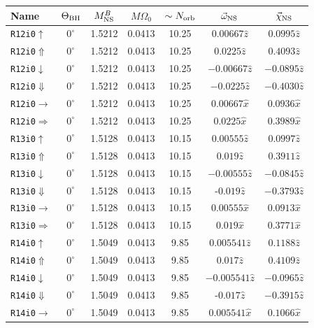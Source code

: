 \begin{longtable}{l|c|c|c|c|c|c}
\centering
\label{Tab:36Sets}
Name & $\Theta_{\rm BH}$ & $M^B_{\rm NS}$ & $M\Omega_{0}$ & $\sim N_{\rm orb}$ & $\vec{\omega}_{\rm NS}$ & $\vec{\chi}_{\rm NS}$  
\\\hline
{\tt R12i0$\uparrow$}&$0^\circ$ & 1.5212 & 0.0413 & 10.25 & $0.00667\hat{z}$ & $0.0995\hat{z}$ \\
{\tt R12i0$\Uparrow$}&$0^\circ$ & 1.5212 & 0.0413 & 10.25 & $0.0225\hat{z}$ & $0.4093\hat{z}$ \\
{\tt R12i0$\downarrow$}&$0^\circ$ & 1.5212 & 0.0413 & 10.25 & $-0.00667\hat{z}$& $-0.0895\hat{z}$\\
{\tt R12i0$\Downarrow$}&$0^\circ$ & 1.5212 & 0.0413 & 10.25 & $-0.0225\hat{z}$ & $-0.4030\hat{z}$ \\
{\tt R12i0$\rightarrow$}&$0^\circ$ & 1.5212 & 0.0413 & 10.25 & $0.00667\hat{x}$ & $0.0936\hat{x}$\\
{\tt R12i0$\Rightarrow$}&$0^\circ$ & 1.5212 & 0.0413 & 10.25 & $0.0225\hat{x}$ & $0.3989\hat{x}$ \\
\hline
{\tt R13i0$\uparrow$}&$0^\circ$ & 1.5128 & 0.0413  & 10.15 & $0.00555\hat{z}$ & $0.0997\hat{z}$ \\
{\tt R13i0$\Uparrow$}&$0^\circ$ & 1.5128 & 0.0413 & 10.15 & $0.019\hat{z}$ & $0.3911\hat{z}$ \\
{\tt R13i0$\downarrow$}&$0^\circ$ & 1.5128 & 0.0413 & 10.15 & $-0.00555\hat{z}$& $-0.0845\hat{z}$\\
{\tt R13i0$\Downarrow$}&$0^\circ$ & 1.5128 & 0.0413 & 10.15 & -$0.019\hat{z}$ & $-0.3793\hat{z}$ \\
{\tt R13i0$\rightarrow$}&$0^\circ$ & 1.5128 & 0.0413 & 10.15 & $0.00555\hat{x}$ & $0.0913\hat{x}$\\
{\tt R13i0$\Rightarrow$}&$0^\circ$ & 1.5128 & 0.0413 & 10.15 & $0.019\hat{x}$ & $0.3771\hat{x}$ \\
\hline
{\tt R14i0$\uparrow$}&$0^\circ$ & 1.5049 & 0.0413 & 9.85 & $0.005541\hat{z}$ & $0.1188\hat{z}$ \\
{\tt R14i0$\Uparrow$}&$0^\circ$ & 1.5049 & 0.0413 & 9.85 & $0.017\hat{z}$ & $0.4109\hat{z}$ \\
{\tt R14i0$\downarrow$}&$0^\circ$ & 1.5049 & 0.0413 & 9.85 & $-0.005541\hat{z}$& $-0.0965\hat{z}$\\
{\tt R14i0$\Downarrow$}&$0^\circ$ & 1.5049 & 0.0413 & 9.85 & -$0.017\hat{z}$ & $-0.3915\hat{z}$\\
{\tt R14i0$\rightarrow$}&$0^\circ$ & 1.5049 & 0.0413 & 9.85 & $0.005541\hat{x}$ & $0.1066\hat{x}$\\

\end{longtable}
